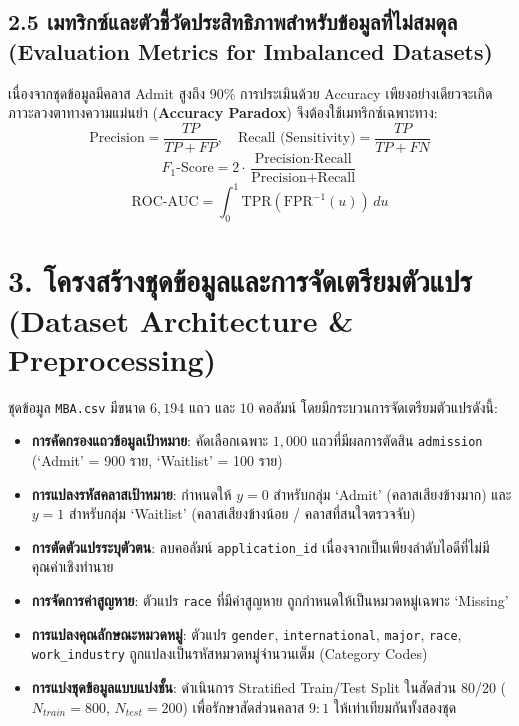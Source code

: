 \documentclass[12pt,a4paper]{article}
\begin{document}
\subsection*{2.5 เมทริกซ์และตัวชี้วัดประสิทธิภาพสำหรับข้อมูลที่ไม่สมดุล\\ \normalsize(Evaluation Metrics for Imbalanced Datasets)}
เนื่องจากชุดข้อมูลมีคลาส Admit สูงถึง 90\% การประเมินด้วย Accuracy เพียงอย่างเดียวจะเกิดภาวะลวงตาทางความแม่นยำ (\textbf{Accuracy Paradox}) จึงต้องใช้เมทริกซ์เฉพาะทาง:
\begin{equation}
    \text{Precision} = \frac{TP}{TP + FP}, \quad \text{Recall (Sensitivity)} = \frac{TP}{TP + FN}
\end{equation}
\begin{equation}
    F_1\text{-Score} = 2 \cdot \frac{\text{Precision} \cdot \text{Recall}}{\text{Precision} + \text{Recall}}
\end{equation}
\begin{equation}
    \text{ROC-AUC} = \int_0^1 \text{TPR}(\text{FPR}^{-1}(u))\,du
\end{equation}

\section*{3. โครงสร้างชุดข้อมูลและการจัดเตรียมตัวแปร\\ \large(Dataset Architecture \& Preprocessing)}

ชุดข้อมูล \texttt{MBA.csv} มีขนาด $6,194$ แถว และ $10$ คอลัมน์ โดยมีกระบวนการจัดเตรียมตัวแปรดังนี้:
\begin{itemize}[leftmargin=18pt, itemsep=2pt]
    \item \textbf{การคัดกรองแถวข้อมูลเป้าหมาย}: คัดเลือกเฉพาะ $1,000$ แถวที่มีผลการตัดสิน \texttt{admission} (`Admit' = 900 ราย, `Waitlist' = 100 ราย)
    \item \textbf{การแปลงรหัสคลาสเป้าหมาย}: กำหนดให้ $y = 0$ สำหรับกลุ่ม `Admit' (คลาสเสียงข้างมาก) และ $y = 1$ สำหรับกลุ่ม `Waitlist' (คลาสเสียงข้างน้อย / คลาสที่สนใจตรวจจับ)
    \item \textbf{การตัดตัวแปรระบุตัวตน}: ลบคอลัมน์ \texttt{application\_id} เนื่องจากเป็นเพียงลำดับไอดีที่ไม่มีคุณค่าเชิงทำนาย
    \item \textbf{การจัดการค่าสูญหาย}: ตัวแปร \texttt{race} ที่มีค่าสูญหาย ถูกกำหนดให้เป็นหมวดหมู่เฉพาะ `Missing'
    \item \textbf{การแปลงคุณลักษณะหมวดหมู่}: ตัวแปร \texttt{gender}, \texttt{international}, \texttt{major}, \texttt{race}, \texttt{work\_industry} ถูกแปลงเป็นรหัสหมวดหมู่จำนวนเต็ม (Category Codes)
    \item \textbf{การแบ่งชุดข้อมูลแบบแบ่งชั้น}: ดำเนินการ Stratified Train/Test Split ในสัดส่วน 80/20 ($N_{train} = 800$, $N_{test} = 200$) เพื่อรักษาสัดส่วนคลาส $9:1$ ให้เท่าเทียมกันทั้งสองชุด
\end{itemize}
\end{document}
